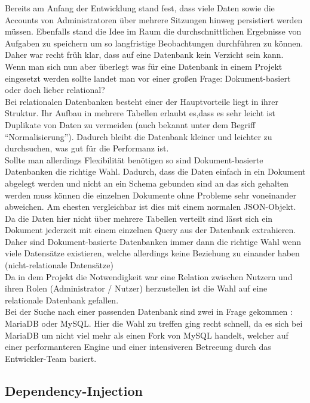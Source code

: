 Bereits am Anfang der Entwicklung stand fest, dass viele Daten sowie die Accounts von Administratoren über mehrere Sitzungen hinweg persistiert werden müssen. Ebenfalls stand die Idee im Raum die durchschnittlichen Ergebnisse von Aufgaben zu speichern um so langfristige Beobachtungen durchführen zu können. Daher war recht früh klar, dass auf eine Datenbank kein Verzicht sein kann. \\

Wenn man sich nun aber überlegt was für eine Datenbank in einem Projekt eingesetzt werden sollte landet man vor einer großen Frage: Dokument-basiert oder doch lieber relational? \\
Bei relationalen Datenbanken besteht einer der Hauptvorteile liegt in ihrer Struktur. Ihr Aufbau in mehrere Tabellen erlaubt es,dass es sehr leicht ist Duplikate von Daten zu vermeiden (auch bekannt unter dem Begriff ``Normalisierung''). Dadurch bleibt die Datenbank kleiner und leichter zu durchsuchen, was gut für die Performanz ist. \\

Sollte man allerdings Flexibilität benötigen so sind Dokument-basierte Datenbanken die richtige Wahl. Dadurch, dass die Daten einfach in ein Dokument abgelegt werden und nicht an ein Schema gebunden sind an das sich gehalten werden muss können die einzelnen Dokumente ohne Probleme sehr voneinander abweichen. Am ehesten vergleichbar ist dies mit einem normalen JSON-Objekt. Da die Daten hier nicht über mehrere Tabellen verteilt sind lässt sich ein Dokument jederzeit mit einem einzelnen Query aus der Datenbank extrahieren. Daher sind Dokument-basierte Datenbanken immer dann die richtige Wahl wenn viele Datensätze existieren, welche allerdings keine Beziehung zu einander haben (nicht-relationale Datensätze) \\

Da in dem Projekt die Notwendigkeit war eine Relation zwischen Nutzern und ihren Rolen (Administrator / Nutzer) herzustellen ist die Wahl auf eine relationale Datenbank gefallen. \\

Bei der Suche nach einer passenden Datenbank sind zwei in Frage gekommen : MariaDB oder MySQL. Hier die Wahl zu treffen ging recht schnell, da es sich bei MariaDB um nicht viel mehr als einen Fork von MySQL handelt, welcher auf einer performanteren Engine und einer intensiveren Betreeung durch das Entwickler-Team basiert.



\subsection{Dependency-Injection}

